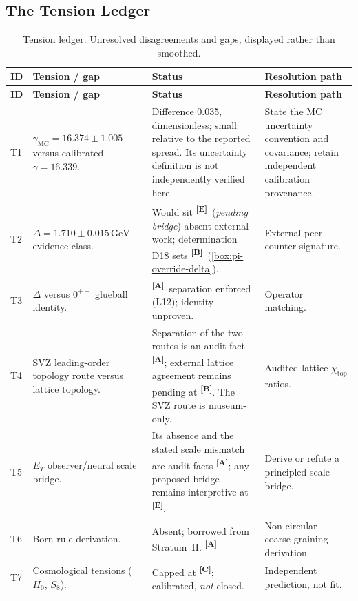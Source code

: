 \documentclass[12pt,a4paper,twoside]{article}
\theoremstyle{plain}
\theoremstyle{definition}
\theoremstyle{remark}
\newcommand{\GeV}{\,\mathrm{GeV}}
\newcommand{\catmark}[1]{\textsuperscript{\textsf{\textbf{[#1]}}}}
\newcommand{\DeltaGap}{1.710 \pm 0.015\GeV} %
\newcommand{\GammaGeom}{16.339} %
\newcommand{\GammaMC}{16.374 \pm 1.005} %
\begin{document}
\newpage
\subsection{The Tension Ledger}
\label{sec:tension-ledger}

{\small
\renewcommand{\arraystretch}{1.3}
\begin{longtable}{p{} p{} p{} p{}}
\caption{Tension ledger. Unresolved disagreements and gaps, displayed
rather than smoothed.}
\label{tab:tensions}\\
\toprule
\textbf{ID} & \textbf{Tension / gap} & \textbf{Status} & \textbf{Resolution path} \\
\midrule
\endfirsthead
\toprule
\textbf{ID} & \textbf{Tension / gap} & \textbf{Status} & \textbf{Resolution path} \\
\midrule
\endhead
\bottomrule
\endfoot
T1 & $\gamma_{\mathrm{MC}} = \GammaMC$ versus calibrated $\gamma = \GammaGeom$. & Difference 0.035, dimensionless; small relative to the reported spread. Its uncertainty definition is not independently verified here. & State the MC uncertainty convention and covariance; retain independent calibration provenance. \\
T2 & $\Delta = \DeltaGap$ evidence class. & Would sit \catmark{E}\ (\emph{pending bridge}) absent external work; determination D18 sets \catmark{B}\ (\cref{box:pi-override-delta}). & External peer counter-signature. \\
T3 & $\Delta$ versus $0^{++}$ glueball identity. & \catmark{A}\ separation enforced (L12); identity unproven. & Operator matching. \\
T4 & SVZ leading-order topology route versus lattice topology. & Separation of the two routes is an audit fact \catmark{A}; external lattice agreement remains pending at \catmark{B}. The SVZ route is museum-only. & Audited lattice $\chi_{\mathrm{top}}$ ratios. \\
T5 & $E_T$ observer/neural scale bridge. & Its absence and the stated scale mismatch are audit facts \catmark{A}; any proposed bridge remains interpretive at \catmark{E}. & Derive or refute a principled scale bridge. \\
T6 & Born-rule derivation. & Absent; borrowed from Stratum~II. \catmark{A} & Non-circular coarse-graining derivation. \\
T7 & Cosmological tensions ($H_0$, $S_8$). & Capped at \catmark{C}; calibrated, \emph{not} closed. & Independent prediction, not fit. \\

\end{longtable}}
\end{document}
